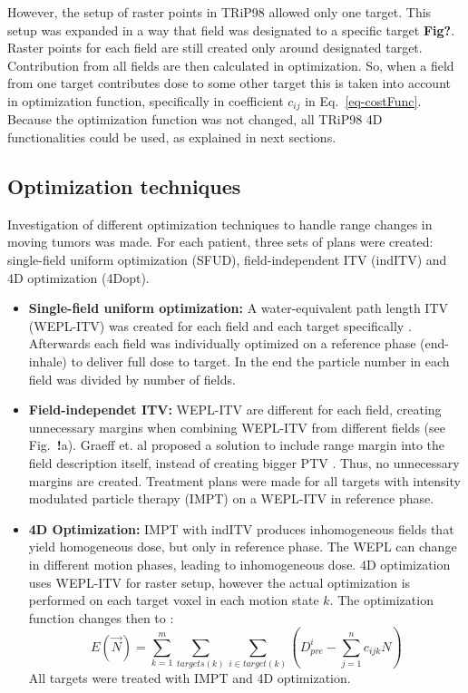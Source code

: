 \documentclass[type=dr, dr=rernat, accentcolor=tud7b,colorbacktitle, bigchapter, openright, twoside, 12pt ]{tudthesis}
\begin{document}
However, the setup of raster points in TRiP98 allowed only one target. This setup was expanded in a way that field was designated to a specific target \textbf{Fig?}. Raster points for each field are still created only around designated target. Contribution from all fields are then calculated in optimization. So, when a field from one target contributes dose to some other target this is taken into account in optimization function, specifically in coefficient $c_{ij}$ in Eq.~\ref{eq-costFunc}. Because the optimization function was not changed, all TRiP98 4D functionalities could be used, as explained in next sections.

\subsection{Optimization techniques}

Investigation of different optimization techniques to handle range changes in moving tumors was made. For each patient, three sets of plans were created: single-field uniform optimization (SFUD), field-independent ITV (indITV) and 4D optimization (4Dopt). 

\begin{itemize}
\item \textbf{Single-field uniform optimization:} A water-equivalent path length ITV (WEPL-ITV) was created for each field and each target specifically \cite{Rietzel2012}. Afterwards each field was individually optimized on a reference phase (end-inhale) to deliver full dose to target. In the end the particle number in each field was divided by number of fields.

\item \textbf{Field-independet ITV:} WEPL-ITV are different for each field, creating unnecessary margins when combining WEPL-ITV from different fields (see Fig.~\textbf{!}a). Graeff et. al proposed a solution to include range margin into the field description itself, instead of creating bigger PTV \cite{Graeff2012}. Thus, no unnecessary margins are created. Treatment plans were made for all targets with intensity modulated particle therapy (IMPT) on a WEPL-ITV in reference phase.

\item \textbf{4D Optimization:} IMPT with indITV produces inhomogeneous fields that yield homogeneous dose, but only in reference phase. The WEPL can change in different motion phases, leading to inhomogeneous dose. 4D optimization uses WEPL-ITV for raster setup, however the actual optimization is performed on each target voxel in each motion state $k$. The optimization function changes then to \cite{Graeff2012}:
\begin{equation}
\label{eq-multiCost}
E(\vec{N}) = \sum_{k=1}^{m}\sum_{targets(k)} \sum_{i\in target(k)} \left( D_{pre}^{i} -\sum_{j=1}^n c_{ijk}N\right)
\end{equation}
All targets were treated with IMPT and 4D optimization. 


\end{itemize}
\end{document}
